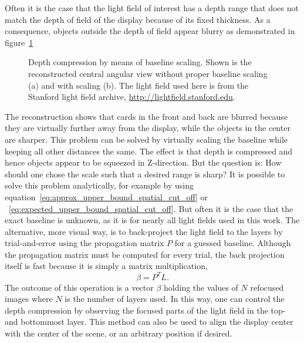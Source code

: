 Often it is the case that the light field of interest has a depth range that does not match the depth of field of the display because of its fixed thickness.
As a consequence, objects outside the depth of field appear blurry as demonstrated in figure~\ref{fig:reconstruction_baseline_unscaled}
\begin{figure}[tb]
	\begin{subfigure}{0.5\textwidth}
		\centering
		
		\caption{}
		\label{fig:reconstruction_baseline_unscaled}
	\end{subfigure}%
	\begin{subfigure}{0.5\textwidth}
		\centering
		
		\caption{}
		\label{fig:reconstruction_baseline_scaled_shifted}
	\end{subfigure}
	\caption[Baseline scaling]
			{Depth compression by means of baseline scaling.
			 Shown is the reconstructed central angular view without proper baseline scaling (a) and with scaling (b).
			 The light field used here is from the Stanford light field archive, \mbox{\url{http://lightfield.stanford.edu}}.}
	\label{fig:baseline_scaling}
\end{figure}
The reconstruction shows that cards in the front and back are blurred because they are virtually further away from the display, while the objects in the center are sharper.
This problem can be solved by virtually scaling the baseline while keeping all other distances the same.
The effect is that depth is compressed and hence objects appear to be squeezed in Z-direction.
But the question is: How should one chose the scale such that a desired range is sharp?
It is possible to solve this problem analytically, for example by using equation~\ref{eq:approx_upper_bound_spatial_cut_off} or ~\ref{eq:expected_upper_bound_spatial_cut_off}.
But often it is the case that the exact baseline is unknown, as it is for nearly all light fields used in this work.
The alternative, more visual way, is to back-project the light field to the layers by trial-and-error using the propagation matrix $P$ for a guessed baseline.
Although the propagation matrix must be computed for every trial, the back projection itself is fast because it is simply a matrix multiplication, 
\begin{equation*}\label{eq:back_projection}
	\beta = P^T L.
\end{equation*}
The outcome of this operation is a vector $\beta$ holding the values of $N$ refocused images where $N$ is the number of layers used.
In this way, one can control the depth compression by observing the focused parts of the light field in the top- and bottommost layer.
This method can also be used to align the display center with the center of the scene, or an arbitrary position if desired.

